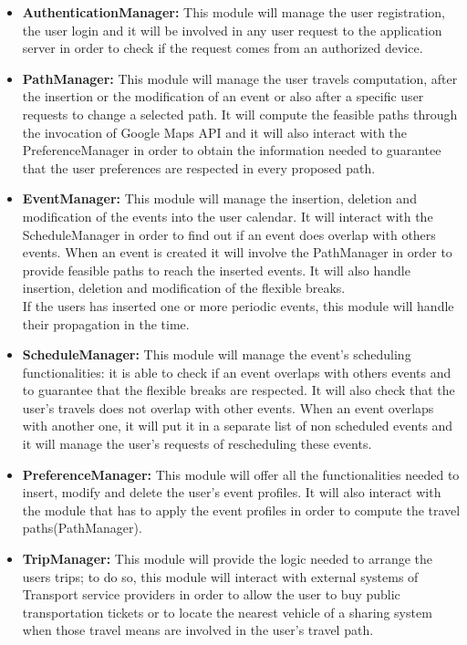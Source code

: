 \begin{itemize}
	\item \textbf{AuthenticationManager:} This module will manage the user registration, the user login and it will be involved in any user request to the application server in order to check if the request comes from an authorized device.
	\item \textbf{PathManager:} This module will manage the user travels computation, after the insertion or the modification of an event or also after a specific user requests to change a selected path. It will compute the feasible paths through the invocation of Google Maps API and it will also interact with the PreferenceManager in order to obtain the information needed to guarantee that the user preferences are respected in every proposed path. 
	\item \textbf{EventManager:} This module will manage the insertion, deletion and modification of the events into the user calendar. It will interact with the ScheduleManager in order to find out if an event does overlap with others events. When an event is created it will involve the PathManager in order to provide feasible paths to reach the inserted events. It will also handle insertion, deletion and modification of the flexible breaks. \\
	If the users has inserted one or more periodic events, this module will handle their propagation in the time. 
	\item \textbf{ScheduleManager:} This module will manage the event's scheduling functionalities: it is able to check if an event overlaps with others events and to guarantee that the flexible breaks are respected. It will also check that the user's travels does not overlap with other events. When an event overlaps with another one, it will put it in a separate list of non scheduled events and it will manage the user's requests of rescheduling these events.
	\item \textbf{PreferenceManager:} This module will offer all the functionalities needed to insert, modify and delete the user's event profiles. It will also interact with the module that has to apply the event profiles in order to compute the travel paths(PathManager).
	\item \textbf{TripManager:} This module will provide the logic needed to arrange the users trips; to do so, this module will interact with external systems of Transport service providers in order to allow the user to buy public transportation tickets or to locate the nearest vehicle of a sharing system when those travel means are involved in the user's travel path.

\end{itemize}
